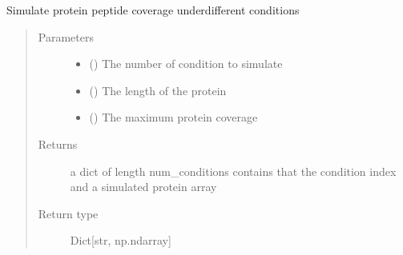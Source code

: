 \documentclass[letterpaper,10pt,english]{sphinxmanual}
\begin{document}
\begin{fulllineitems}
\label{\detokenize{IPTK.Utils:IPTK.Utils.UtilityFunction.simulate_protein_representation}}
Simulate protein peptide coverage under\sphinxhyphen{}different conditions
\begin{quote}\begin{description}
\item[{Parameters}] \leavevmode\begin{itemize}
\item {} 
 (\sphinxstyleliteralemphasis{\sphinxupquote{{[}}}\sphinxstyleliteralemphasis{\sphinxupquote{{]}}}) \textendash{} The number of condition to simulate

\item {} 
 (\sphinxstyleliteralemphasis{\sphinxupquote{{[}}}\sphinxstyleliteralemphasis{\sphinxupquote{{]}}}) \textendash{} The length of the protein

\item {} 
 (\sphinxstyleliteralemphasis{\sphinxupquote{{[}}}\sphinxstyleliteralemphasis{\sphinxupquote{{]}}}) \textendash{} The maximum protein coverage

\end{itemize}

\item[{Returns}] \leavevmode
a dict of length num\_conditions contains that the condition index and a simulated protein array

\item[{Return type}] \leavevmode
Dict{[}str, np.ndarray{]}

\end{description}\end{quote}

\end{fulllineitems}
\end{document}
